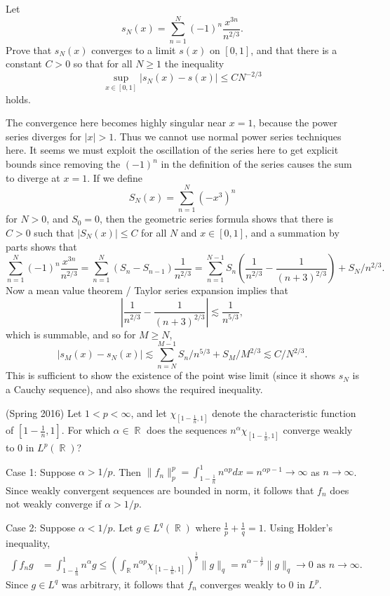 \documentclass[answers]{exam}
\DeclareMathOperator{\RR}{\mathbb{R}}
\begin{document}
\begin{questions}
\question Let
%
\[ s_N(x) = \sum_{n = 1}^N (-1)^n \frac{x^{3n}}{n^{2/3}}. \]
%
Prove that $s_N(x)$ converges to a limit $s(x)$ on $[0,1]$, and that there is a constant $C > 0$ so that for all $N \geq 1$ the inequality
%
\[ \sup_{x \in [0,1]} |s_N(x) - s(x)|\leq C N^{-2/3} \]
%
holds.
\begin{solution}
    The convergence here becomes highly singular near $x = 1$, because the power series diverges for $|x| > 1$. Thus we cannot use normal power series techniques here. It seems we must exploit the oscillation of the series here to get explicit bounds since removing the $(-1)^n$ in the definition of the series causes the sum to diverge at $x = 1$. If we define
    \[ S_N(x) = \sum_{n = 1}^N (-x^3)^n \]
    for $N > 0$, and $S_0 = 0$, then the geometric series formula shows that there is $C > 0$ such that $|S_N(x)| \leq C$ for all $N$ and $x \in [0,1]$, and a summation by parts shows that
    \[ \sum_{n = 1}^N (-1)^n \frac{x^{3n}}{n^{2/3}} = \sum_{n = 1}^N (S_n - S_{n-1}) \frac{1}{n^{2/3}} = \sum_{n = 1}^{N-1} S_n \left( \frac{1}{n^{2/3}} - \frac{1}{(n+3)^{2/3}} \right) + S_N / n^{2/3}. \]
    Now a mean value theorem / Taylor series expansion implies that
    \[ \left| \frac{1}{n^{2/3}} - \frac{1}{(n+3)^{2/3}} \right| \lesssim \frac{1}{n^{5/3}}, \]
    which is summable, and so for $M \geq N$,
    \[ |s_M(x) - s_N(x)| \lesssim \sum_{n = N}^{M-1} S_n / n^{5/3} + S_M / M^{2/3} \lesssim C/N^{2/3}. \]
    This is sufficient to show the existence of the point wise limit (since it shows $s_N$ is a Cauchy sequence), and also shows the required inequality.
\end{solution}


\item (Spring 2016) Let $1<p<\infty$, and let $\chi_{[1-\frac{1}{n},1]}$ denote the characteristic function of $[1-\frac{1}{n},1]$. For which $\alpha\in \RR$ does the sequences $n^{\alpha}\chi_{[1-\frac{1}{n},1]}$ converge weakly to $0$ in $L^{p}(\RR)$?

\begin{solution}
  Case 1: Suppose $\alpha> 1/p$. Then $\| f_{n} \|_{p}^{p} = \int_{1-\frac{1}{n}}^{1}n^{\alpha p}dx = n^{\alpha p - 1}\to \infty$ as $n\to\infty$. Since weakly convergent sequences are bounded in norm, it follows that $f_{n}$ does not weakly converge if $\alpha>1/p$.

  Case 2: Suppose $\alpha<1/p$. Let $g\in L^{q}(\RR)$ where $\frac{1}{p}+\frac{1}{q}=1$. Using Holder's inequality,
  \begin{align*}
    \int f_{n}g &= \int_{1-\frac{1}{n}}^{1}n^{\alpha} g \leq \left( \int_{\RR}n^{\alpha p}\chi_{[1-\frac{1}{n},1]} \right)^{\frac{1}{p}} \| g \|_{q} = n^{\alpha-\frac{1}{p}} \| g \|_{q}\to 0 \text{ as }n\to\infty.
  \end{align*}
  Since $g\in L^{q}$ was arbitrary, it follows that $f_{n}$ converges weakly to $0$ in $L^{p}$.


\end{solution}
\end{questions}
\end{document}
